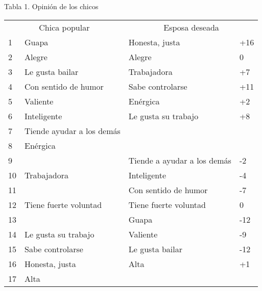 \begin{table}[]
\centering
Tabla 1. Opinión de los chicos

\label{my-label}
\begin{tabular}{llll}
\multicolumn{2}{c}{Chica popular} & \multicolumn{2}{c}{Esposa deseada} \\
1    & Guapa                      & Honesta, justa               & +16 \\
2    & Alegre                     & Alegre                       & 0   \\
3    & Le gusta bailar            & Trabajadora                  & +7  \\
4    & Con sentido de humor       & Sabe controlarse             & +11 \\
5    & Valiente                   & Enérgica                     & +2  \\
6    & Inteligente                & Le gusta su trabajo          & +8  \\
7    & Tiende ayudar a los demás  &                              &     \\
8    & Enérgica                   &                              &     \\
9    &                            & Tiende a ayudar a los demás  & -2  \\
10   & Trabajadora                & Inteligente                  & -4  \\
11   &                            & Con sentido de humor         & -7  \\
12   & Tiene fuerte voluntad      & Tiene fuerte voluntad        & 0   \\
13   &                            & Guapa                        & -12 \\
14   & Le gusta su trabajo        & Valiente                     & -9 \\
15   & Sabe controlarse	  	  & Le gusta bailar              & -12 \\
16   & Honesta, justa	          & Alta                         & +1 \\
17   & Alta                       & &  
\end{tabular}
\end{table}


